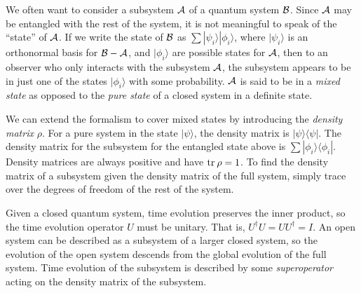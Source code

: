 \documentclass{report}
\newcommand{\ket}[1]{|{#1}\rangle}
\newcommand{\bra}[1]{\langle{#1}|}
\newcommand{\Sum}{\sum}
\begin{document}
We often want to consider a subsystem ${\cal A}$ of a quantum system 
${\cal B}$.  Since ${\cal A}$ may be entangled with the rest of the system, it 
is not meaningful to speak of the ``state'' of ${\cal A}$.  If we write the state of ${\cal B}$ as $\Sum \ket{\psi_i} \ket{\phi_i}$, where $\ket{\psi_i}$ 
is an orthonormal basis for ${\cal B} - {\cal A}$, and $\ket{\phi_i}$ are 
possible states for ${\cal A}$, then to an observer who only interacts with 
the subsystem ${\cal A}$, the subsystem appears to be in just one of the states 
$\ket{\phi_i}$ with some probability.  ${\cal A}$ is said to be in a 
{\em mixed state} as opposed to the {\em pure state} of a closed system in 
a definite state.

We can extend the formalism to cover mixed states by introducing the 
{\em density matrix} $\rho$.  For a pure system in the state $\ket{\psi}$, 
the density matrix is $\ket{\psi} \bra{\psi}$.  The density matrix for the 
subsystem for the entangled state above is $\Sum \ket{\phi_i} 
\bra{\phi_i}$.  Density matrices are always positive and have 
${\rm tr}\:\rho = 1$.  To find the density matrix of a subsystem given the 
density matrix of the full system, simply trace over the degrees of freedom of 
the rest of the system.

Given a closed quantum system, time evolution preserves the inner 
product, so the time evolution operator $U$ must be unitary.  That is, 
$U^\dagger U = U U^\dagger = I$.  An open system can be described as a 
subsystem of a larger closed system, so the evolution of the open system 
descends from the global evolution of the full system.  Time evolution of 
the subsystem is described by some {\em superoperator} acting 
on the density matrix of the subsystem.
\end{document}
